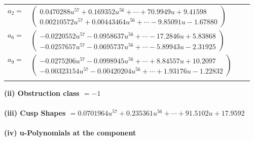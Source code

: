 \documentclass[1p]{elsarticle_modified}
\theoremstyle{definition}
\begin{document}
\begin{tabular}{m{7pt} m{180pt} m{7pt} m{180pt} }
\flushright $a_{2}=$&$\begin{pmatrix}0.0470288 u^{57}+0.169352 u^{56}+\cdots+70.9949 u+9.41598\\0.00210572 u^{57}+0.00443464 u^{56}+\cdots-9.85091 u-1.67880\end{pmatrix}$ \\
\flushright $a_{6}=$&$\begin{pmatrix}-0.0220552 u^{57}-0.0958637 u^{56}+\cdots-17.2846 u+5.83868\\-0.0257657 u^{57}-0.0695737 u^{56}+\cdots-5.89943 u-2.31925\end{pmatrix}$ \\
\flushright $a_{9}=$&$\begin{pmatrix}-0.0275206 u^{57}-0.0998945 u^{56}+\cdots+8.84557 u+10.2097\\-0.00323154 u^{57}-0.00420204 u^{56}+\cdots+1.93176 u-1.22832\end{pmatrix}$\\&\end{tabular}
\flushleft \textbf{(ii) Obstruction class $= -1$}\\~\\
\flushleft \textbf{(iii) Cusp Shapes $= 0.0701964 u^{57}+0.235361 u^{56}+\cdots+91.5102 u+17.9592$}\\~\\
\newpage\renewcommand{\arraystretch}{1}
\flushleft \textbf{(iv) u-Polynomials at the component}\newline \\
\end{document}
